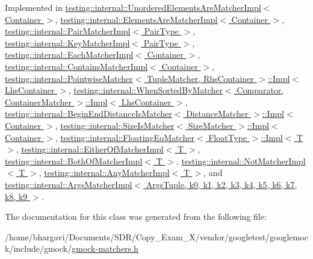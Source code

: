 Implemented in \hyperlink{classtesting_1_1internal_1_1_unordered_elements_are_matcher_impl_aac5710bbfb7e6ae7d69b72ba99b14938}{testing\+::internal\+::\+Unordered\+Elements\+Are\+Matcher\+Impl$<$ Container $>$}, \hyperlink{classtesting_1_1internal_1_1_elements_are_matcher_impl_a1d6060dd6c8e9ce40ebb9b1825902292}{testing\+::internal\+::\+Elements\+Are\+Matcher\+Impl$<$ Container $>$}, \hyperlink{classtesting_1_1internal_1_1_pair_matcher_impl_a691add64a7dd061451722cdf95a6eba2}{testing\+::internal\+::\+Pair\+Matcher\+Impl$<$ Pair\+Type $>$}, \hyperlink{classtesting_1_1internal_1_1_key_matcher_impl_afdf81c23c20be5825fe7a01d5e10a5cb}{testing\+::internal\+::\+Key\+Matcher\+Impl$<$ Pair\+Type $>$}, \hyperlink{classtesting_1_1internal_1_1_each_matcher_impl_a1c84c5cf88a78eed95c7bebf008f567c}{testing\+::internal\+::\+Each\+Matcher\+Impl$<$ Container $>$}, \hyperlink{classtesting_1_1internal_1_1_contains_matcher_impl_aa70ab361eb1d4f2aa01d2cee3ef4cb25}{testing\+::internal\+::\+Contains\+Matcher\+Impl$<$ Container $>$}, \hyperlink{classtesting_1_1internal_1_1_pointwise_matcher_1_1_impl_ad3cad1e0b3e5d3a204c5b0f5a95d178b}{testing\+::internal\+::\+Pointwise\+Matcher$<$ Tuple\+Matcher, Rhs\+Container $>$\+::\+Impl$<$ Lhs\+Container $>$}, \hyperlink{classtesting_1_1internal_1_1_when_sorted_by_matcher_1_1_impl_af63d23e035f9938be00fb3bb56977ee6}{testing\+::internal\+::\+When\+Sorted\+By\+Matcher$<$ Comparator, Container\+Matcher $>$\+::\+Impl$<$ Lhs\+Container $>$}, \hyperlink{classtesting_1_1internal_1_1_begin_end_distance_is_matcher_1_1_impl_a78763d6532f99d794f7e952076eb8e02}{testing\+::internal\+::\+Begin\+End\+Distance\+Is\+Matcher$<$ Distance\+Matcher $>$\+::\+Impl$<$ Container $>$}, \hyperlink{classtesting_1_1internal_1_1_size_is_matcher_1_1_impl_ae68cb5cb21f7c2c0026b1afdf7e74ebf}{testing\+::internal\+::\+Size\+Is\+Matcher$<$ Size\+Matcher $>$\+::\+Impl$<$ Container $>$}, \hyperlink{classtesting_1_1internal_1_1_floating_eq_matcher_1_1_impl_af44c07dae0a5ccf6d9d7cfef077ad678}{testing\+::internal\+::\+Floating\+Eq\+Matcher$<$ Float\+Type $>$\+::\+Impl$<$ T $>$}, \hyperlink{classtesting_1_1internal_1_1_either_of_matcher_impl_af662eda6c0499fa92a00caa6de019090}{testing\+::internal\+::\+Either\+Of\+Matcher\+Impl$<$ T $>$}, \hyperlink{classtesting_1_1internal_1_1_both_of_matcher_impl_ad0311a21d4c8231a824a396b9f4d09a1}{testing\+::internal\+::\+Both\+Of\+Matcher\+Impl$<$ T $>$}, \hyperlink{classtesting_1_1internal_1_1_not_matcher_impl_a7bba5c61d441787acba61a069f5d5ac2}{testing\+::internal\+::\+Not\+Matcher\+Impl$<$ T $>$}, \hyperlink{classtesting_1_1internal_1_1_any_matcher_impl_a03fe8956cfe9827b0ceacbd130fb88c1}{testing\+::internal\+::\+Any\+Matcher\+Impl$<$ T $>$}, and \hyperlink{classtesting_1_1internal_1_1_args_matcher_impl_a9c9760b144a5e207082fe040c869ad39}{testing\+::internal\+::\+Args\+Matcher\+Impl$<$ Args\+Tuple, k0, k1, k2, k3, k4, k5, k6, k7, k8, k9 $>$}.



The documentation for this class was generated from the following file\+:\begin{DoxyCompactItemize}
\item 
/home/bhargavi/\+Documents/\+S\+D\+R/\+Copy\+\_\+\+Exam\+\_\+X/vendor/googletest/googlemock/include/gmock/\hyperlink{gmock-matchers_8h}{gmock-\/matchers.\+h}\end{DoxyCompactItemize}
